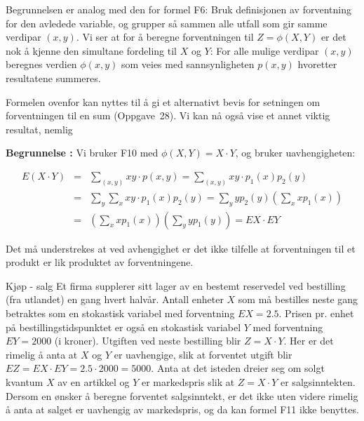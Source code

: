 \begin{center}  \end{center}

\noindent Begrunnelsen er analog med den for formel F6: Bruk definisjonen
av forventning for den avledede variable, og grupper så sammen
alle utfall som gir samme verdipar $(x,y)$. Vi ser at for å beregne 
forventningen til $Z=\phi (X,Y)$ er det nok å kjenne den simultane
fordeling til $X$ og $Y$: For alle mulige verdipar $(x,y)$ beregnes verdien
$\phi (x,y)$ som veies med sannsynligheten $p(x,y)$ hvoretter resultatene
summeres.

Formelen ovenfor kan nyttes til å gi et alternativt bevis for
setningen om forventningen til en sum (Oppgave~28). Vi kan nå også
vise et annet viktig resultat, nemlig

\begin{center} \framebox[10.5cm]{\begin{minipage}{9.5cm}
\[ \mbox{\ \ F11. \ \ \ } E(X\cdot Y)=EX\cdot EY
 \mbox{\ \ såframt $X$ og $Y$ er uavhengige.} \]
\mbox{}  \end{minipage}} \end{center}
{\bf Begrunnelse :} Vi bruker F10 med $\phi (X,Y)=X\cdot Y$, og bruker
uavhengigheten:
 
\begin{eqnarray*}
 E(X \cdot Y)&=&\sum_{(x,y)}xy \cdot p(x,y)=\sum_{(x,y)}xy \cdot p_1(x)p_2(y)\\
  &=& \sum_y \sum_x xy \cdot p_1(x)p_2(y)= \sum_y yp_2(y)(\sum_x xp_1(x)) \\
          &=&(\sum_x xp_1(x))(\sum_y yp_1(y))=EX \cdot EY
\end{eqnarray*}

\noindent Det må understrekes at ved avhengighet er det ikke tilfelle at
forventningen til et produkt er lik produktet av forventningene.\\

\begin{eksempel}{Kjøp - salg}
Et firma supplerer sitt lager av en bestemt reservedel ved
bestilling (fra utlandet) en gang hvert halvår. Antall enheter
$X$ som må bestilles neste gang betraktes som en stokastisk
variabel med forventning $EX=2.5$. Prisen pr. enhet på
bestillingstidspunktet er også en stokastisk variabel $Y$ med
forventning $EY=2000$ (i kroner). Utgiften ved neste bestilling
blir $Z=X\cdot Y$. Her er det rimelig å anta at $X$ og $Y$ er
uavhengige, slik at forventet utgift blir $EZ=EX\cdot EY=2.5\cdot
2000=5000$. Anta at det isteden dreier seg om solgt kvantum $X$
av en artikkel og $Y$ er markedspris slik at $Z=X\cdot Y$ er
salgsinntekten. Dersom en ønsker å beregne forventet salgsinntekt,
er det ikke uten videre rimelig å anta at salget er uavhengig av
markedspris, og da kan formel F11 ikke benyttes.
\end{eksempel}

